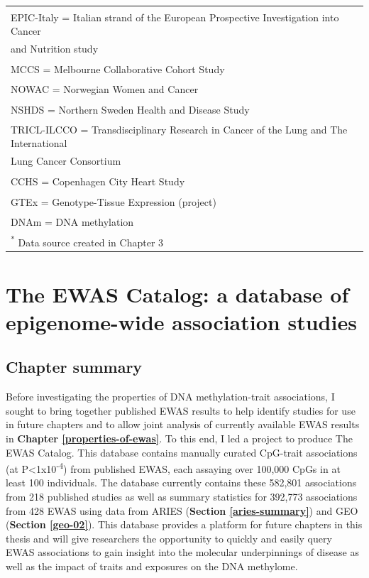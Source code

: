 \documentclass[11pt,twoside]{bristolthesis}
\begin{document}
\begin{table}[H]
{\begin{tabular}[t]{llll}
\multicolumn{4}{l}{\textsuperscript{} EPIC-Italy = Italian strand of the European Prospective Investigation into Cancer}\\
\multicolumn{4}{l}{and Nutrition study}\\
\multicolumn{4}{l}{\textsuperscript{} MCCS = Melbourne Collaborative Cohort Study}\\
\multicolumn{4}{l}{\textsuperscript{} NOWAC = Norwegian Women and Cancer}\\
\multicolumn{4}{l}{\textsuperscript{} NSHDS = Northern Sweden Health and Disease Study}\\
\multicolumn{4}{l}{\textsuperscript{} TRICL-ILCCO = Transdisciplinary Research in Cancer of the Lung and The International}\\
\multicolumn{4}{l}{Lung Cancer Consortium}\\
\multicolumn{4}{l}{\textsuperscript{} CCHS = Copenhagen City Heart Study}\\
\multicolumn{4}{l}{\textsuperscript{} GTEx = Genotype-Tissue Expression (project)}\\
\multicolumn{4}{l}{\textsuperscript{} DNAm = DNA methylation}\\
\multicolumn{4}{l}{\textsuperscript{*} Data source created in Chapter 3}\\
\end{tabular}}
\end{table}
\hypertarget{ewas-catalog}{%
\chapter{The EWAS Catalog: a database of epigenome-wide association studies}\label{ewas-catalog}}

\hypertarget{chapter-summary-03}{%
\section{Chapter summary}\label{chapter-summary-03}}

Before investigating the properties of DNA methylation-trait associations, I sought to bring together published EWAS results to help identify studies for use in future chapters and to allow joint analysis of currently available EWAS results in \textbf{Chapter \ref{properties-of-ewas}}. To this end, I led a project to produce The EWAS Catalog. This database contains manually curated CpG-trait associations (at P\textless1x10\textsuperscript{-4}) from published EWAS, each assaying over 100,000 CpGs in at least 100 individuals. The database currently contains these 582,801 associations from 218 published studies as well as summary statistics for 392,773 associations from 428 EWAS using data from ARIES (\textbf{Section \ref{aries-summary}}) and GEO (\textbf{Section \ref{geo-02}}). This database provides a platform for future chapters in this thesis and will give researchers the opportunity to quickly and easily query EWAS associations to gain insight into the molecular underpinnings of disease as well as the impact of traits and exposures on the DNA methylome.
\end{document}
